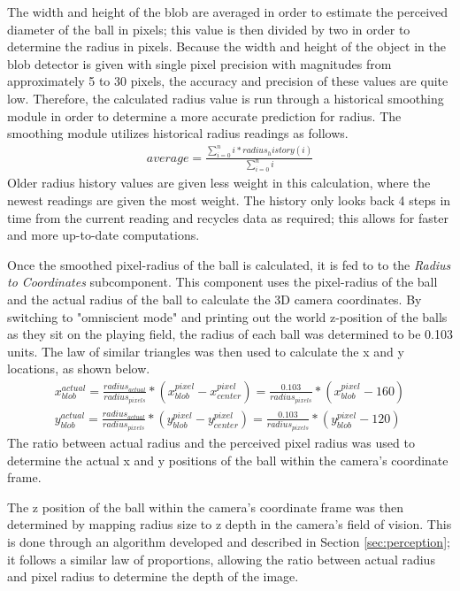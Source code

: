 \documentclass{article}
\begin{document}
The width and height of the blob are averaged in order to estimate the perceived diameter of the ball in pixels; this value is then divided by two in order to determine the radius in pixels. Because the width and height of the object in the blob detector is given with single pixel precision with magnitudes from approximately 5 to 30 pixels, the accuracy and precision of these values are quite low. Therefore, the calculated radius value is run through a historical smoothing module in order to determine a more accurate prediction for radius. The smoothing module utilizes historical radius readings as follows.
\begin{align}
average = \frac{\sum_{i=0}^{n} i * radius_history(i)}{\sum_{i=0}^{n} i} \label{eq:radiussmooth}
\end{align}
Older radius history values are given less weight in this calculation, where the newest readings are given the most weight. The history only looks back 4 steps in time from the current reading and recycles data as required; this allows for faster and more up-to-date computations. \par 

Once the smoothed pixel-radius of the ball is calculated, it is fed to to the \emph{Radius to Coordinates} subcomponent. This component uses the pixel-radius of the ball and the actual radius of the ball to calculate the 3D camera coordinates. By switching to "omniscient mode" and printing out the world z-position of the balls as they sit on the playing field, the radius of each ball was determined to be 0.103 units. The law of similar triangles was then used to calculate the x and y locations, as shown below.
\begin{align}
x_{blob}^{actual} = \frac{radius_{actual}}{radius_{pixels}} * (x_{blob}^{pixel} - x_{center}^{pixel}) = \frac{0.103}{radius_{pixels}} * (x_{blob}^{pixel} - 160) \\
y_{blob}^{actual} = \frac{radius_{actual}}{radius_{pixels}} * (y_{blob}^{pixel} - y_{center}^{pixel}) = \frac{0.103}{radius_{pixels}} * (y_{blob}^{pixel} - 120)
\end{align}
The ratio between actual radius and the perceived pixel radius was used to determine the actual x and y positions of the ball within the camera's coordinate frame. \par

The z position of the ball within the camera's coordinate frame was then determined by mapping radius size to z depth in the camera's field of vision. This is done through an algorithm developed and described in Section \ref{sec:perception}; it follows a similar law of proportions, allowing the ratio between actual radius and pixel radius to determine the depth of the image. \par
\end{document}

